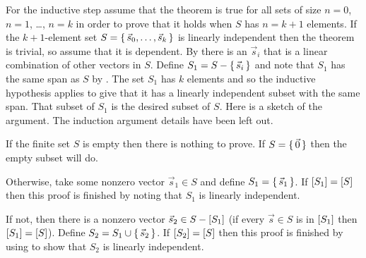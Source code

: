\begin{exercises}
\begin{answer}
\begin{exparts}
           For the inductive step assume that the theorem is true for all 
           sets of size $n=0$, $n=1$, \ldots, $n=k$ 
           in order to prove that it holds when \( S \) has $n=k+1$ elements.
           If the $k+1$-element set \( S=\mbox{$\{\,\vec{s}_0,\dots,\vec{s}_{k}\,\}$} \) 
           is linearly independent then the theorem is trivial,
           so assume that it is dependent.
           By  there is an \( \vec{s}_i \)
           that is a linear combination of other vectors in \( S \).
           Define \( S_1=S-\mbox{$\{\,\vec{s}_i\,\}$} \) and note that 
           \( S_1 \) has the same span as \( S \) by
           .
           The set \( S_1 \) has \( k \) elements and 
           so the inductive hypothesis
           applies to give that it has a linearly independent subset with the 
           same span.
           That subset of \( S_1 \) is the desired subset of \( S \).
         \partsitem Here is a sketch of the argument.
           The induction argument details have been left out.

           If the finite set \( S \) is empty then there is nothing to prove.
           If \( S=\mbox{$\{\,\vec{0}\,\}$} \) then the empty subset will do.

           Otherwise, take some nonzero vector \( \vec{s}_1\in S \)
           and define \( S_1=\mbox{$\{\,\vec{s}_1\,\}$} \).
           If \( \relax [S_1\relax ]=\relax [S\relax ] \) then
           this proof is finished by noting that \( S_1 \) is linearly
           independent.

           If not, then there is a nonzero
           vector \( \vec{s}_2\in S-\relax [S_1\relax ] \)
           (if every \( \vec{s}\in S \) is in \( \relax [S_1\relax ] \) then
           \( \relax [S_1\relax ]=\relax [S\relax ] \)).
           Define \( S_2=S_1\cup\mbox{$\{\,\vec{s}_2\,\}$} \).
           If \( \relax [S_2\relax ]=\relax [S\relax ] \) then
           this proof is finished by using 
           to show that \( S_2 \) is linearly independent.


\end{exparts}
\end{answer}
\end{exercises}
